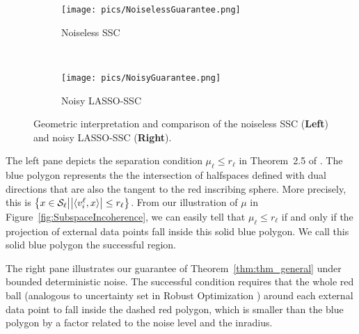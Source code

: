 \documentclass[12pt,heading]{ctexbook}
\begin{document}
\begin{figure}
        \centering
        \begin{subfigure}[t]{0.4\textwidth}
          \centering
              \texttt{[image: pics/NoiselessGuarantee.png]}\\
               \caption{Noiseless SSC}
               \label{fig.noiseless_guarantee}
        \end{subfigure}%
        ~ %
        \begin{subfigure}[t]{0.4\textwidth}
              \centering
              \texttt{[image: pics/NoisyGuarantee.png]}\\
              \caption{Noisy LASSO-SSC} \label{fig.noisy_guarantee}
        \end{subfigure}
   \caption{Geometric interpretation and comparison of the noiseless SSC (\textbf{Left}) and noisy LASSO-SSC (\textbf{Right}).
   }
   \label{fig:geom_interpretation}
\end{figure}

The left pane depicts the separation condition $\mu_\ell \leq r_\ell$ in Theorem~2.5 of \cite{soltanolkotabi2011geometric}. The blue polygon represents the the intersection of halfspaces defined with dual directions that are also the tangent to the red inscribing sphere. More precisely, this is $\left\{x\in \mathcal{S}_\ell \middle| \big|\langle v_i^{\ell}, x\rangle\big| \leq r_\ell\right\}$. From our illustration of $\mu$ in Figure~\ref{fig:SubspaceIncoherence}, we can easily tell that $\mu_\ell\leq r_\ell$ if and only if the projection of external data points fall inside this solid blue polygon. We call this solid blue polygon the successful region.

The right pane illustrates our guarantee of Theorem~\ref{thm:thm_general} under bounded deterministic noise. The successful condition requires that the whole red ball (analogous to uncertainty set in Robust Optimization \cite{ben1998robust,bertsimas2004price}) around each external data point to fall inside the dashed red polygon, which is smaller than the blue polygon by a factor related to the noise level and the inradius.
\end{document}
